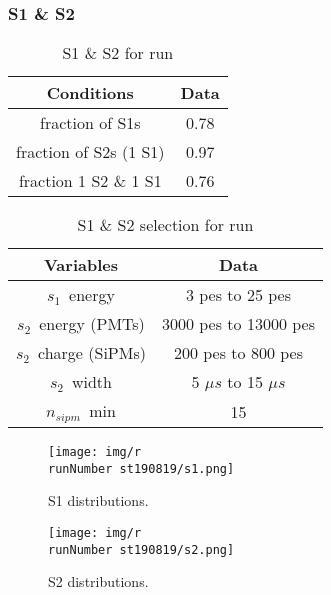 \begin{frame}
\frametitle{S1 \& S2}

\begin{table}[h!]
\caption{S1 \& S2 for run \runNumber}
\begin{center}
\begin{tabular}{|c|c|}
\hline
Conditions & Data \\
\hline
fraction of S1s & 0.78 \\
fraction of S2s (1 S1) & 0.97 \\
fraction 1 S2 \& 1 S1 & 0.76 \\
\hline
\end{tabular}
\end{center}
\label{r\runNumber.data}
\end{table}%

\begin{table}[h!]
\caption{S1 \& S2 selection for run \runNumber}
\begin{center}
\begin{tabular}{|c|c|}
\hline
Variables & Data \\
\hline
$s_1$~energy & 3 pes to 25 pes \\
$s_2$~energy (PMTs) & 3000 pes to 13000 pes \\
$s_2$~charge (SiPMs) & 200 pes to 800 pes \\
$s_2$~width & 5 $\mu s$ to 15 $\mu s$ \\
$n_{sipm}$~min & 15\\
\hline
\end{tabular}
\end{center}
\label{r\runNumber.sel}
\end{table}%
\end{frame}


\begin{frame}
\begin{figure}
  \begin{center}
      \texttt{[image: img/r\\runNumber st190819/s1.png]}
    \caption{S1 distributions.}
  \end{center}
\end{figure}
\end{frame}

\begin{frame}
\begin{figure}
  \begin{center}
      \texttt{[image: img/r\\runNumber st190819/s2.png]}
    \caption{S2 distributions.}
  \end{center}
\end{figure}
\end{frame}

